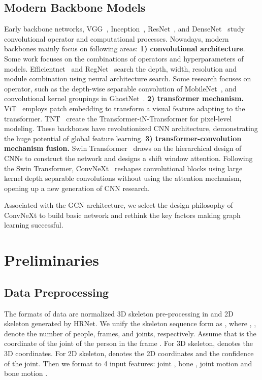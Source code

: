 \documentclass[10pt,twocolumn,letterpaper]{article}
\begin{document}
\subsection{Modern Backbone Models}
\label{ssec:related_efficient}
Early backbone networks, VGG~\cite{simonyan2014very}, Inception~\cite{szegedy2015going}, ResNet~\cite{he2016deep}, and DenseNet~\cite{huang2017densely} study convolutional operator and computational processes. Nowadays, modern backbones mainly focus on following areas:
\textbf{1) convolutional architecture}. Some work focuses on the combinations of operators and hyperparameters of models. Efficientnet~\cite{tan2019efficientnet} and RegNet~\cite{radosavovic2020designing} search the depth, width, resolution and module combination using neural architecture search. Some research focuses on operator, such as the depth-wise separable convolution of MobileNet~\cite{howard2017mobilenets}, and convolutional kernel groupings in GhostNet~\cite{han2020ghostnet}.
\textbf{2) transformer mechanism.} ViT~\cite{dosovitskiy2020image} employs patch embedding to transform a visual feature adapting to the transformer. TNT~\cite{han2021transformer} create the Transformer-iN-Transformer for pixel-level modeling. These backbones have revolutionized CNN architecture, demonstrating the huge potential of global feature learning.
\textbf{3) transformer-convolution mechanism fusion.} Swin Transformer~\cite{liu2021swin} draws on the hierarchical design of CNNs to construct the network and designs a shift window attention. Following the Swin Transformer, ConvNeXt~\cite{liu2022convnet} reshapes convolutional blocks using large kernel depth separable convolutions without using the attention mechanism, opening up a new generation of CNN research. 

Associated with the GCN architecture, we select the design philosophy of ConvNeXt to build basic network and rethink the key factors making graph learning successful. 
\section{Preliminaries}
\label{sec:Preliminaries}
\subsection{Data Preprocessing}
\label{ssec:preprocessing}
The formats of data are normalized 3D skeleton pre-processing in \cite{chen2021channel} and 2D skeleton generated by HRNet\cite{duan2021revisiting}. We unify the skeleton sequence form as , where , ,  denote the number of people, frames, and joints, respectively. Assume that  is the coordinate of the joint  of the person  in the frame . For 3D skeleton,  denotes the 3D coordinates. For 2D skeleton,  denotes the 2D coordinates and the confidence of the joint. Then we format  to 4 input features: joint , bone , joint motion  and bone motion .
\end{document}
